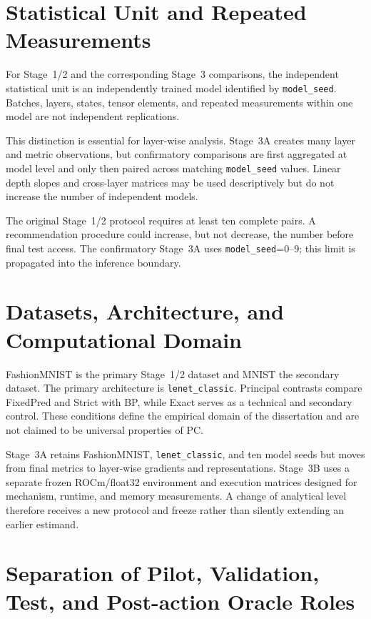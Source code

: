 \section{Statistical Unit and Repeated Measurements}
\label{sec:method-stat-unit-en}

For Stage~1/2 and the corresponding Stage~3 comparisons, the independent statistical
unit is an independently trained model identified by \texttt{model\_seed}. Batches,
layers, states, tensor elements, and repeated measurements within one model are not
independent replications.

This distinction is essential for layer-wise analysis. Stage~3A creates many layer and
metric observations, but confirmatory comparisons are first aggregated at model level
and only then paired across matching \texttt{model\_seed} values. Linear depth slopes
and cross-layer matrices may be used descriptively but do not increase the number of
independent models.

The original Stage~1/2 protocol requires at least ten complete pairs. A recommendation
procedure could increase, but not decrease, the number before final test access. The
confirmatory Stage~3A uses \texttt{model\_seed}=0--9; this limit is propagated into
the inference boundary.

\section{Datasets, Architecture, and Computational Domain}

FashionMNIST is the primary Stage~1/2 dataset and MNIST the secondary dataset. The
primary architecture is \texttt{lenet\_classic}. Principal contrasts compare
FixedPred and Strict with BP, while Exact serves as a technical and secondary control.
These conditions define the empirical domain of the dissertation and are not claimed
to be universal properties of PC.

Stage~3A retains FashionMNIST, \texttt{lenet\_classic}, and ten model seeds but moves
from final metrics to layer-wise gradients and representations. Stage~3B uses a
separate frozen ROCm/float32 environment and execution matrices designed for
mechanism, runtime, and memory measurements. A change of analytical level therefore
receives a new protocol and freeze rather than silently extending an earlier estimand.

\section{Separation of Pilot, Validation, Test, and Post-action Oracle Roles}
\label{sec:method-data-separation-en}

